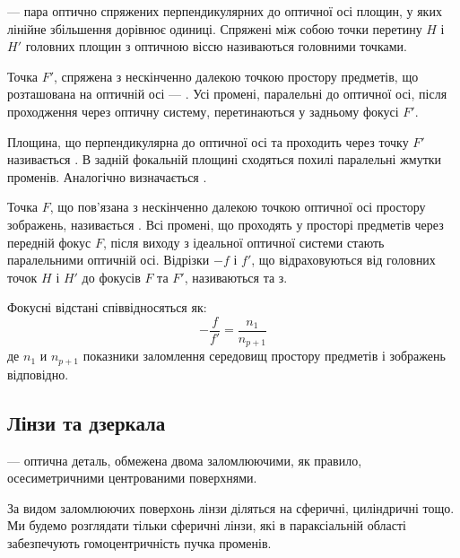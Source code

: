 \begin{figure}[h!]\centering
	
	\label{pic:Kardinal_Elements}
\end{figure}

 --- пара оптично спряжених перпендикулярних до оптичної осі площин, у яких лінійне збільшення дорівнює одиниці. Спряжені між собою точки перетину $H$ і $H'$ головних площин з оптичною віссю називаються головними точками.

Точка $F'$, спряжена з нескінченно далекою точкою простору предметів, що розташована на оптичній осі --- . Усі промені, паралельні до оптичної осі, після проходження через оптичну систему, перетинаються у задньому фокусі $F'$.

Площина, що перпендикулярна до оптичної осі та проходить через точку $F'$ називається . В задній фокальній площині сходяться похилі паралельні жмутки променів.  Аналогічно визначається .

Точка $F$, що пов'язана з нескінченно далекою точкою оптичної осі простору
зображень, називається . Всі промені, що проходять у просторі предметів через передній фокус $F$, після виходу з ідеальної оптичної системи стають паралельними оптичній осі. Відрізки $-f$ і $f'$, що відраховуються від головних точок $H$ і $H'$ до фокусів $F$ та $F'$, називаються  та з.

Фокусні відстані співвідносяться як:
\begin{equation}
	-\frac{f}{f'} = \frac{n_1}{n_{p+1}}
\end{equation}
де $n_1$ и $n_{p+1}$ показники заломлення середовищ простору предметів і зображень відповідно.




\subsection{Лінзи та дзеркала}


 --- оптична деталь, обмежена двома заломлюючими, як правило, осесиметричними центрованими поверхнями.

За видом заломлюючих поверхонь лінзи діляться на сферичні, циліндричні тощо. Ми
будемо розглядати тільки сферичні лінзи, які в параксіальній області забезпечують гомоцентричність пучка променів.

